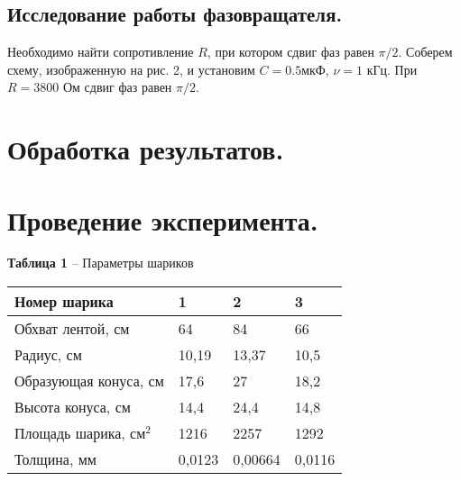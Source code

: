 \documentclass[12pt,a4paper]{article}
\begin{document}
    \subsection{Исследование работы фазовращателя.}
        Необходимо найти сопротивление $R$, при котором сдвиг фаз равен $\pi/2$. Соберем схему, изображенную на рис. 2, и установим $C = 0.5$мкФ, $\nu = 1$ кГц. При $R = 3800$ Ом сдвиг фаз равен $\pi/2$.
        
    \section{Обработка результатов.}
   
   
   
   
   
   
   
   
   
   
   
   
        
\newpage
\section{Проведение эксперимента.}

       
       
        \begin{table}[!h]
        \begin{flushleft}
       		\hspace{134}\textbf{Таблица 1} -- Параметры шариков\\
        \end{flushleft}
            \begin{center}
                \begin{tabular}{ | l | l | l | l |}
                \hline
                Номер шарика            &   1       &   2       &   3       \\
                \hline
                Обхват лентой, см       &   64      &   84      &   66      \\
                Радиус, см              &   10,19   &   13,37   &   10,5    \\
                Образующая конуса, см   &   17,6    &   27      &   18,2   \\
                Высота конуса, см       &   14,4    &   24,4    &   14,8    \\
                Площадь шарика, см$^2$  &   1216    &   2257    &   1292    \\
                Толщина, мм             &   0,0123  &   0,00664 &   0,0116  \\  
                \hline
                \end{tabular}   
            \end{center}
        \end{table}
       
\end{document}
